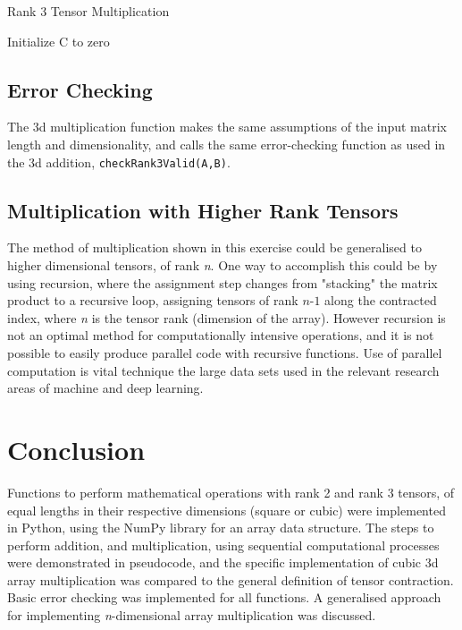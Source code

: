 \documentclass[10 pt, conference]{cssconf}
\begin{document}
\begin{algorithm}[ht] \small
\caption{Rank 3 Tensor Multiplication}\label{pc:rank3_mult}
    	 \SetAlgoLined
	Initialize C to zero\;
\end{algorithm}%

\subsection{Error Checking}
The 3d multiplication function makes the same assumptions of the input matrix length and dimensionality, and calls the same error-checking function as used in the 3d addition, \verb|checkRank3Valid(A,B)|.

\subsection{Multiplication with Higher Rank Tensors}
The method of multiplication shown in this exercise could be generalised to higher dimensional tensors, of rank \textit{n}. One way to accomplish this could be by using recursion, where the assignment step changes from "stacking" the matrix product to a recursive loop, assigning tensors of rank $\textit{n-1}$ along the contracted index, where \textit{n} is the tensor rank (dimension of the array). However recursion is not an optimal method for computationally intensive operations, and it is not possible to easily produce parallel code with recursive functions. Use of parallel computation is vital technique the large data sets used in the relevant research areas of machine and deep learning.

\section{Conclusion}
Functions to perform mathematical operations with rank 2 and rank 3 tensors, of equal lengths in their respective dimensions (square or cubic) were implemented in Python, using the NumPy library for an array data structure. The steps to perform addition, and multiplication, using sequential computational processes were demonstrated in pseudocode, and the specific implementation of cubic 3d array multiplication was compared to the general definition of tensor contraction. Basic error checking was implemented for all functions. A generalised approach for implementing \textit{n}-dimensional array multiplication was discussed. 

\balance
\clearpage
\newpage
\onecolumn

{}


\end{document}
